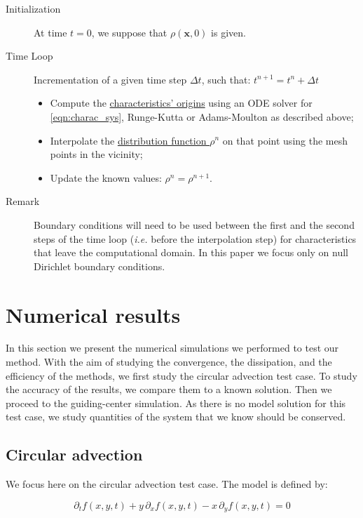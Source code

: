 \documentclass[proc]{edpsmath}
\begin{document}
\begin{description}
	\item[Initialization] At time $t=0$, we suppose that $\rho(\mathbf{x}, 0)$ is given.
	\item[Time Loop] Incrementation of a given time step $\Delta t$, such that: $t^{n+1} = t^n + \Delta t$
		\begin{itemize}
		\item Compute the \underline{characteristics' origins} using an ODE solver for \eqref{eqn:charac_sys}, Runge-Kutta or Adams-Moulton as described above;
		\item Interpolate the \underline{distribution function $\rho^n$} on that point using the mesh points in the vicinity;
		\item Update the known values: $\rho^n = \rho^{n+1}$.
		\end{itemize}
	\item[Remark] Boundary conditions will need to be used between the first and the second steps of the time loop (\emph{i.e.} before the interpolation step) for characteristics that leave the computational domain. In this paper we focus only on null Dirichlet boundary conditions.
\end{description}



 
\section{Numerical results}
\label{sec:results}
In this section we present the  numerical simulations we performed to test our method. With the aim of studying the convergence, the dissipation, and the  efficiency of the methods, we first study the circular advection test case. To study the accuracy of the results, we compare them to a known solution. Then we proceed to the guiding-center simulation. As there is no model solution for this test case, we study quantities of the system that we know should be conserved.


\subsection{Circular advection}

We focus here on the circular advection test case. The model is defined by:

	\begin{equation}
		\partial_t f(x,y,t) + y\,\partial_x f(x,y,t) - x \,\partial_y f(x,y,t) = 0 
	\end{equation}
\end{document}

